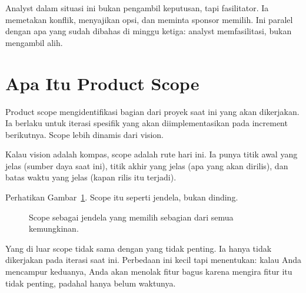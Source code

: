 \documentclass[11pt,a4paper]{article}
\begin{document}
Analyst dalam situasi ini bukan pengambil keputusan, tapi fasilitator. Ia memetakan konflik, menyajikan opsi, dan meminta sponsor memilih. Ini paralel dengan apa yang sudah dibahas di minggu ketiga: analyst memfasilitasi, bukan mengambil alih.

\section{Apa Itu Product Scope}

Product scope mengidentifikasi bagian dari proyek saat ini yang akan dikerjakan. Ia berlaku untuk iterasi spesifik yang akan diimplementasikan pada increment berikutnya. Scope lebih dinamis dari vision.

Kalau vision adalah kompas, scope adalah rute hari ini. Ia punya titik awal yang jelas (sumber daya saat ini), titik akhir yang jelas (apa yang akan dirilis), dan batas waktu yang jelas (kapan rilis itu terjadi).

Perhatikan Gambar~\ref{fig:window}. Scope itu seperti jendela, bukan dinding.

\begin{figure}[H]
	\centering
	\caption{Scope sebagai jendela yang memilih sebagian dari semua kemungkinan.}
	\label{fig:window}
\end{figure}

Yang di luar scope tidak sama dengan yang tidak penting. Ia hanya tidak dikerjakan pada iterasi saat ini. Perbedaan ini kecil tapi menentukan: kalau Anda mencampur keduanya, Anda akan menolak fitur bagus karena mengira fitur itu tidak penting, padahal hanya belum waktunya.
\end{document}
